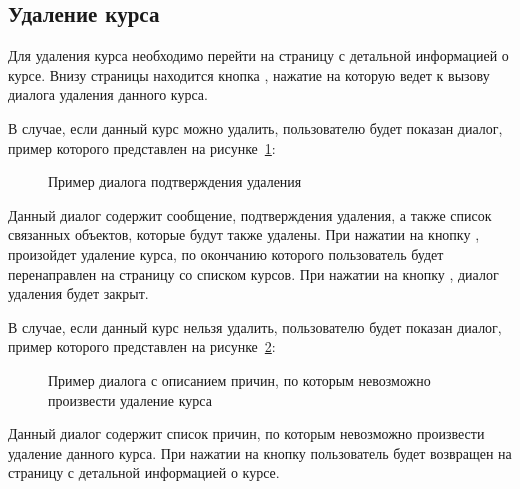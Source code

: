 \subsection{Удаление курса}
Для удаления курса необходимо перейти на страницу с детальной информацией о курсе.
Внизу страницы находится кнопка , нажатие на которую ведет к вызову диалога удаления данного курса.

В случае, если данный курс можно удалить, пользователю будет показан диалог, пример которого представлен на рисунке~\ref{img:course:course_success_delete_message}:
\begin{figure}[H]
	\caption{Пример диалога подтверждения удаления}
	\label{img:course:course_success_delete_message}
\end{figure}
Данный диалог содержит сообщение, подтверждения удаления, а также список связанных объектов, которые будут также удалены.
При нажатии на кнопку , произойдет удаление курса, по окончанию которого пользователь будет перенаправлен на страницу со списком курсов.
При нажатии на кнопку , диалог удаления будет закрыт.

В случае, если данный курс нельзя удалить, пользователю будет показан диалог, пример которого представлен на рисунке~\ref{img:course:course_fail_delete_message}:
\begin{figure}[H]
	\caption{Пример диалога с описанием причин, по которым невозможно произвести удаление курса}
	\label{img:course:course_fail_delete_message}
\end{figure}
Данный диалог содержит список причин, по которым невозможно произвести удаление данного курса.
При нажатии на кнопку  пользователь будет возвращен на страницу с детальной информацией о курсе.


